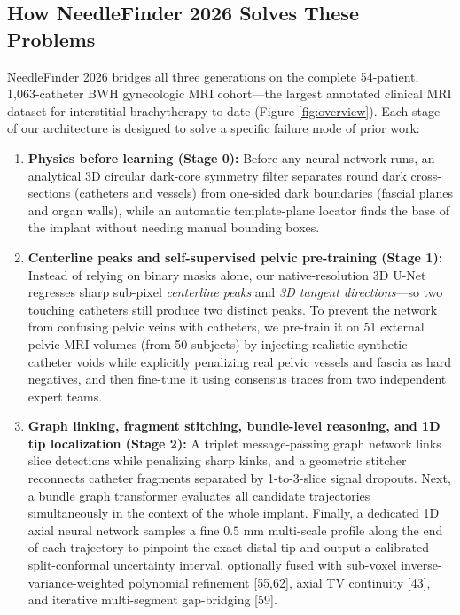 \documentclass[
  11pt,
]{article}
\providecommand{\tightlist}{%
  \setlength{\itemsep}{0pt}\setlength{\parskip}{0pt}}
\begin{document}
\subsection{How NeedleFinder 2026 Solves These
Problems}\label{how-needlefinder-2026-solves-these-problems}

NeedleFinder 2026 bridges all three generations on the complete
54-patient, 1,063-catheter BWH gynecologic MRI cohort---the largest
annotated clinical MRI dataset for interstitial brachytherapy to date
(Figure \ref{fig:overview}). Each stage of our architecture is designed
to solve a specific failure mode of prior work:

\begin{enumerate}
\def\labelenumi{\arabic{enumi}.}
\tightlist
\item
  \textbf{Physics before learning (Stage 0):} Before any neural network
  runs, an analytical 3D circular dark-core symmetry filter separates
  round dark cross-sections (catheters and vessels) from one-sided dark
  boundaries (fascial planes and organ walls), while an automatic
  template-plane locator finds the base of the implant without needing
  manual bounding boxes.
\item
  \textbf{Centerline peaks and self-supervised pelvic pre-training
  (Stage 1):} Instead of relying on binary masks alone, our
  native-resolution 3D U-Net regresses sharp sub-pixel \emph{centerline
  peaks} and \emph{3D tangent directions}---so two touching catheters
  still produce two distinct peaks. To prevent the network from
  confusing pelvic veins with catheters, we pre-train it on 51 external
  pelvic MRI volumes (from 50 subjects) by injecting realistic synthetic
  catheter voids while explicitly penalizing real pelvic vessels and
  fascia as hard negatives, and then fine-tune it using consensus traces
  from two independent expert teams.
\item
  \textbf{Graph linking, fragment stitching, bundle-level reasoning, and
  1D tip localization (Stage 2):} A triplet message-passing graph
  network links slice detections while penalizing sharp kinks, and a
  geometric stitcher reconnects catheter fragments separated by
  1-to-3-slice signal dropouts. Next, a bundle graph transformer
  evaluates all candidate trajectories simultaneously in the context of
  the whole implant. Finally, a dedicated 1D axial neural network
  samples a fine \(0.5\text{ mm}\) multi-scale profile along the end of
  each trajectory to pinpoint the exact distal tip and output a
  calibrated split-conformal uncertainty interval, optionally fused with
  sub-voxel inverse-variance-weighted polynomial refinement {[}55,62{]},
  axial TV continuity {[}43{]}, and iterative multi-segment gap-bridging
  {[}59{]}.
\end{enumerate}
\end{document}
